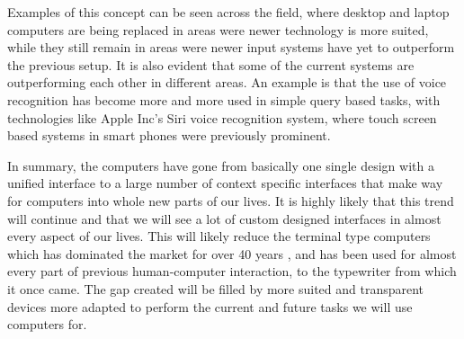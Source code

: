 Examples of this concept can be seen across the field, where desktop and laptop computers are being replaced in areas were newer technology is more suited, while they still remain in areas were newer input systems have yet to outperform the previous setup. It is also evident that some of the current systems are outperforming each other in different areas. An example is that the use of voice recognition has become more and more used in simple query based tasks, with technologies like Apple Inc's Siri voice recognition system, where touch screen based systems in smart phones were previously prominent.

In summary, the computers have gone from basically one single design with a unified interface to a large number of context specific interfaces that make way for computers into whole new parts of our lives. It is highly likely that this trend will continue and that we will see a lot of custom designed interfaces in almost every aspect of our lives. This will likely reduce the terminal type computers which has dominated the market for over 40 years , and has been used for almost every part of previous human-computer interaction, to the typewriter from which it once came. The gap created will be filled by more suited and transparent devices more adapted to perform the current and future tasks we will use computers for.